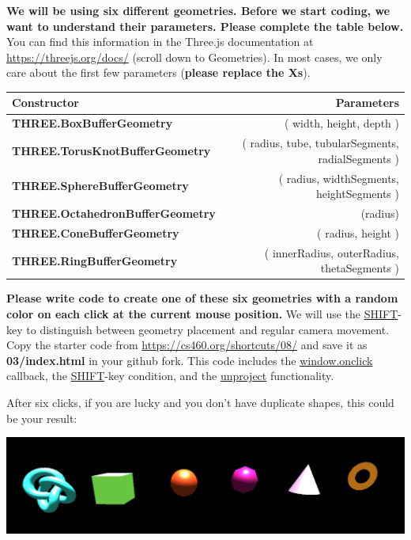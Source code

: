 \documentclass[10pt,oneside,onecolumn,letterpaper]{article}
\begin{document}
\vspace{.5cm} %

\noindent \textbf{We will be using six different geometries. Before we start coding, we want to understand their parameters. Please complete the table below.} You can find this information in the Three.js documentation at \url{https://threejs.org/docs/} (scroll down to Geometries). In most cases, we only care about the first few parameters (\textbf{please replace the Xs}).

\vspace{.5cm} %

\begin{tabular}{lr}
    \toprule
    Constructor & Parameters \\
    \midrule
    \textbf{THREE.BoxBufferGeometry} & ( width, height, depth ) \\
    \textbf{THREE.TorusKnotBufferGeometry} & ( radius, tube, tubularSegments, radialSegments ) \\
    \textbf{THREE.SphereBufferGeometry} & ( radius, widthSegments, heightSegments ) \\
    \textbf{THREE.OctahedronBufferGeometry} & (radius) \\
    \textbf{THREE.ConeBufferGeometry} & ( radius, height ) \\
    \textbf{THREE.RingBufferGeometry} & ( innerRadius, outerRadius, thetaSegments )
\end{tabular}


\vspace{.5cm} %

\textbf{Please write code to create one of these six geometries with a random color on each click at the current mouse position.} We will use the \url{SHIFT}-key to distinguish between geometry placement and regular camera movement. Copy the starter code from \url{https://cs460.org/shortcuts/08/} and save it as \textbf{03/index.html} in your github fork. This code includes the \url{window.onclick} callback, the \url{SHIFT}-key condition, and the \url{unproject} functionality.

\vspace{.5cm} %

\noindent After six clicks, if you are lucky and you don't have duplicate shapes, this could be your result:

\begin{center}
    \includegraphics[width=.7\textwidth]{gfx/for-each-shapes.png}
\end{center}
\end{document}
